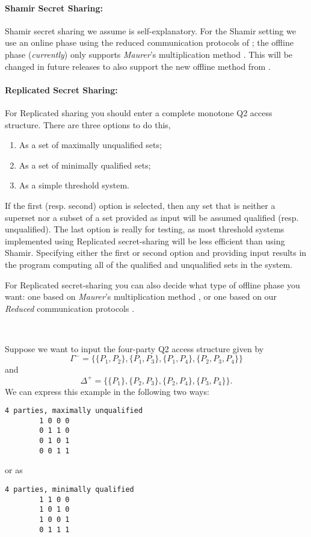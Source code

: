 \paragraph{Shamir Secret Sharing:}
Shamir secret sharing we assume is self-explanatory.
For the Shamir setting we use an online phase using the reduced communication
protocols of \cite{KRSW}; 
the offline phase ({\em currently}) only supports {\em Maurer}'s multiplication method
\cite{Maurer}.
This will be changed in future releases to also support the new offline method from
\cite{SW18}.


\paragraph{Replicated Secret Sharing:}
For Replicated sharing you should enter a complete monotone Q2 access structure.
There are three options to do this, 
\begin{enumerate}
\item As a set of maximally unqualified sets;
\item As a set of minimally qualified sets;
\item As a simple threshold system.
\end{enumerate}
If the first (resp. second) option is selected, then any set that is neither 
a superset nor a subset of a set provided as input will be assumed qualified (resp. unqualified).
The last option is really for testing, as most 
threshold systems implemented using Replicated secret-sharing will be
less efficient than using Shamir.  
Specifying either the first or second option and providing input
results in the program computing all of the qualified and unqualified
sets in the system.  

For Replicated secret-sharing you
can also decide what type of offline phase you want: one based on
{\em Maurer}'s multiplication method \cite{Maurer}, 
or one based on our {\em Reduced} communication protocols \cite{KRSW}.

~~

\noindent
Suppose we want to input the four-party Q2 access structure given by
\[\Gamma^- = \{\{P_1, P_2\}, \{P_1, P_3\}, \{P_1, P_4\}, \{P_2, P_3, P_4\}\}\]
and
\[\Delta^+ = \{\{P_1\}, \{P_2, P_3\}, \{P_2, P_4\}, \{P_3, P_4\}\}.\]
We can express this example in the following two ways:
\begin{verbatim}
4 parties, maximally unqualified
        1 0 0 0
        0 1 1 0
        0 1 0 1
        0 0 1 1
\end{verbatim}
or as
\begin{verbatim}
4 parties, minimally qualified
        1 1 0 0
        1 0 1 0
        1 0 0 1
        0 1 1 1
\end{verbatim}

